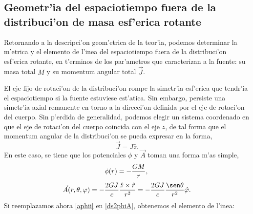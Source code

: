 \subsection{Geometr'ia del espaciotiempo fuera de la distribuci'on de masa esf'erica rotante}

Retornando a la descripci'on geom'etrica de la teor'ia, podemos determinar la m'etrica  y el elemento de l'inea del espaciotiempo fuera de la distribuci'on esf'erica rotante, en t'erminos de los par'ametros que caracterizan a la fuente: su masa total $M$ y su momentum angular total $\vec{J}$.

El eje fijo de rotaci'on de la distribuci'on rompe la simetr'ia esf'erica que tendr'ia el espaciotiempo si la fuente estuviese est'atica. Sin embargo, persiste una simetr'ia axial remanente  en torno a la direcci'on definida por el eje de rotaci'on del cuerpo. Sin p'erdida de generalidad, podemos elegir un sistema coordenado en que el eje de rotaci'on del cuerpo coincida con el eje $z$, de tal forma que el momentum angular de la distribuci'on se pueda expresar en la forma,
\begin{equation}
\vec{J}=J\hat{z}.
\end{equation}
En este caso, se tiene que los potenciales $\phi$ y $\vec{A}$ toman una forma m'as simple,
\begin{equation}
\phi(r) = -\frac{GM}{r},\label{phiii}\\
\end{equation}
\begin{equation}
\vec{A}(r,\theta,\varphi ) = -\frac{2GJ}{c}\frac{\hat{z}\times\hat{r}}{r^2}
=-\frac{2GJ}{c}\frac{\sen \theta }{r^2}\hat{\varphi}%
.\label{aphii}
\end{equation}
Si reemplazamos ahora \eqref{aphii} en \eqref{ds2phiA}, obtenemos el elemento de l'inea:
